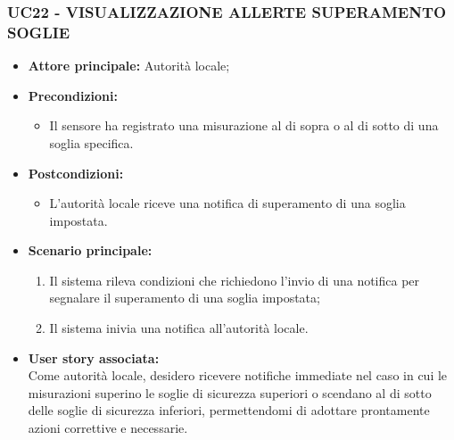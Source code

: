 \subsubsection{UC22 - VISUALIZZAZIONE ALLERTE SUPERAMENTO SOGLIE}
\begin{itemize}
      \item \textbf{Attore principale:} Autorità locale;
      \item \textbf{Precondizioni:}
            \begin{itemize}
                  \item Il sensore ha registrato una misurazione al di sopra o al di sotto di una soglia specifica.
            \end{itemize}
      \item \textbf{Postcondizioni:}
            \begin{itemize}
                  \item  L'autorità locale riceve una notifica di superamento di una soglia impostata.
            \end{itemize}
      \item \textbf{Scenario principale:}
            \begin{enumerate}
                  \item  Il sistema rileva condizioni che richiedono l'invio di una notifica per segnalare il superamento di una soglia impostata;
                  \item Il sistema inivia una notifica all'autorità locale.
            \end{enumerate}
      \item \textbf{User story associata:} \\
      Come autorità locale, desidero ricevere notifiche immediate nel caso in cui le misurazioni superino le soglie di sicurezza superiori o scendano al di sotto delle soglie di sicurezza inferiori, permettendomi di adottare prontamente azioni correttive e necessarie.
\end{itemize}